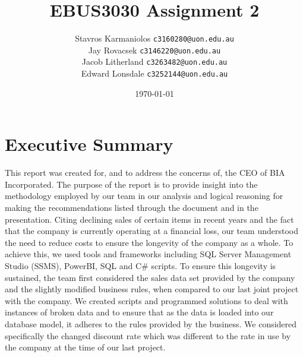 \documentclass{article}
\title{EBUS3030 Assignment 2}
\author{
        Stavros Karmaniolos 
        \texttt{c3160280@uon.edu.au}\\
        Jay Rovacsek
        \texttt{c3146220@uon.edu.au}\\
        Jacob Litherland
        \texttt{c3263482@uon.edu.au}\\
        Edward Lonsdale
        \texttt{c3252144@uon.edu.au}
    }
\date{\today}
\newcommand\backgroundimage{
        \put(-5,0){
        \parbox[b][\paperheight]{\paperwidth}{
        \vfill
        \centering
        \vfill
    }}}
\begin{document}
    \lstset{style=sql}
    \AddToShipoutPicture{\backgroundimage}

    \begin{titlingpage}
        \maketitle
    \end{titlingpage}

    \tableofcontents

\newpage
    

    
    


    \section{Executive Summary}
    \label{sec:Executive Summary}
    This report was created for, and to address the concerns of, the CEO of BIA Incorporated. 
    The purpose of the report is to provide insight into the methodology employed by our team 
    in our analysis and logical reasoning for making the recommendations listed through the 
    document and in the presentation. Citing declining sales of certain items in recent years 
    and the fact that the company is currently operating at a financial loss, our team understood 
    the need to reduce costs to ensure the longevity of the company as a whole. To achieve 
    this, we used tools and frameworks including SQL Server Management Studio (SSMS), 
    PowerBI, SQL and C\# scripts. To ensure this longevity is sustained, the team first 
    considered the sales data set provided by the company and the slightly modified business 
    rules, when compared to our last joint project with the company. We created scripts and 
    programmed solutions to deal with instances of broken data and to ensure that as the data 
    is loaded into our database model, it adheres to the rules provided by the business. We 
    considered specifically the changed discount rate which was different to the rate in use 
    by the company at the time of our last project. \\
    
\end{document}
